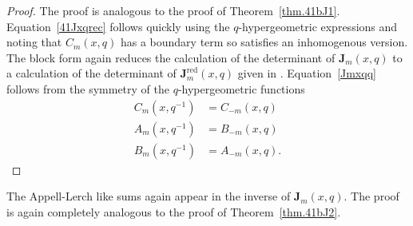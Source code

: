 \documentclass[12pt,reqno]{amsart}
\theoremstyle{definition}
\def\be{\begin{equation}}
\def\ee{\end{equation}}
\def\bJ{\mathbf J}
\def\RED{\mathrm{red}}
\begin{document}
\begin{proof}
The proof is analogous to the proof of Theorem~\ref{thm.41bJ1}.
Equation~\eqref{41Jxqrec} follows quickly using the $q$-hypergeometric expressions and
noting that $C_{m}(x,q)$ has a boundary term so satisfies an inhomogenous version.
The block form again reduces the calculation of the determinant of $\bJ_{m}(x,q)$ to a
calculation of the determinant of $\bJ^\RED_{m}(x,q)$ given in \cite{GGM:peacock}.
Equation~\eqref{Jmxqq} follows from the symmetry of the $q$-hypergeometric functions
\be
\label{ABCqinv}
\begin{aligned}
C_{m}(x,q^{-1}) &=
  C_{-m}(x,q)
\\
A_{m}(x,q^{-1}) &=
B_{-m}(x,q)
\\
B_{m}(x,q^{-1}) &=
A_{-m}(x,q).
\end{aligned}
\ee
\end{proof}
The Appell-Lerch like sums again appear in the inverse of $\bJ_{m}(x,q)$. The proof
is again completely analogous to the proof of Theorem~\ref{thm.41bJ2}.
\end{document}
